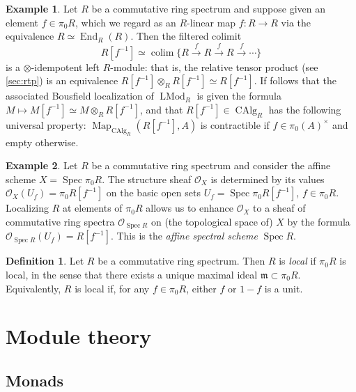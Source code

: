 \documentclass{article}
\theoremstyle{definition}
\newtheorem{definition}{Definition}[subsection]
\newtheorem{example}{Example}[subsection]
\renewcommand{\O}{\mathcal{O}}
\newcommand{\too}{\longrightarrow}
\DeclareMathOperator{\LMod}{LMod}
\DeclareMathOperator{\CAlg}{CAlg}
\DeclareMathOperator{\End}{End}
\DeclareMathOperator{\Spec}{Spec}
\DeclareMathOperator{\Map}{Map}
\DeclareMathOperator{\colim}{colim}
\begin{document}
\begin{example}\label{eg:zar}
Let $R$ be a commutative ring spectrum and suppose given an element $f\in\pi_0 R$, which we regard as an $R$-linear map $f:R\to R$ via the equivalence $R\simeq\End_R(R)$.
Then the filtered colimit
\[
R[f^{-1}]\simeq\colim\{ R\overset{f}{\too} R\overset{f}{\too} R\overset{f}{\too}\cdots\}
\]
is a $\otimes$-idempotent left $R$-module: that is, the relative tensor product (see \autoref{sec:rtp}) is an equivalence $R[f^{-1}]\otimes_R R[f^{-1}]\simeq R[f^{-1}]$.
If follows that the associated Bousfield localization of $\LMod_R$ is given the formula $M\mapsto M[f^{-1}]\simeq M\otimes_R R[f^{-1}]$, and that $R[f^{-1}]\in\CAlg_R$ has the following universal property: $\Map_{\CAlg_R}(R[f^{-1}],A)$ is contractible if $f\in\pi_0(A)^\times$ and empty otherwise.
\end{example}
\begin{example}\label{eg:zars}
Let $R$ be a commutative ring spectrum and consider the affine scheme $X=\Spec\pi_0 R$. The structure sheaf $\O_{X}$ is determined by its values $\O_{X}(U_f)=\pi_0 R[f^{-1}]$ on the basic open sets $U_f=\Spec\pi_0 R[f^{-1}]$, $f\in\pi_0 R$.
Localizing $R$ at elements of $\pi_0 R$ allows us to enhance $\O_{X}$ to a sheaf of commutative ring spectra $\O_{\Spec R}$ on (the topological space of) $X$ by the formula $\O_{\Spec R}(U_f)=R[f^{-1}]$.
This is the {\em affine spectral scheme} $\Spec R$.
\end{example}

\begin{definition}
Let $R$ be a commutative ring spectrum.
Then $R$ is {\em local} if $\pi_0 R$ is local, in the sense that there exists a unique maximal ideal $\mathfrak{m}\subset\pi_0 R$.
Equivalently, $R$ is local if, for any $f\in\pi_0 R$, either $f$ or $1-f$ is a unit.
\end{definition}


\section{Module theory}\label{sec:mt}


\subsection{Monads}
\end{document}

